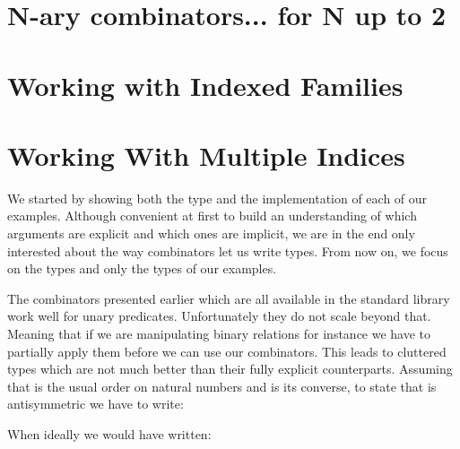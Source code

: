\begin{abstract}
\end{abstract}

\section{N-ary combinators... for N up to 2}





\section{Working with Indexed Families}






\section{Working With Multiple Indices}

We started by showing both the type and the implementation of each of our
examples. Although convenient at first to build an understanding of which
arguments are explicit and which ones are implicit, we are in the end only
interested about the way combinators let us write types. From now on, we
focus on the types and only the types of our examples.

The combinators presented earlier which are all available in the standard
library work well for unary predicates. Unfortunately they do not scale
beyond that. Meaning that if we are manipulating binary relations for
instance we have to partially apply them before we can use our combinators.
This leads to cluttered types which are not much better than their fully
explicit counterparts. Assuming that  is the usual order on natural
numbers and  is its converse, to state that  is antisymmetric
we have to write:


When ideally we would have written:

